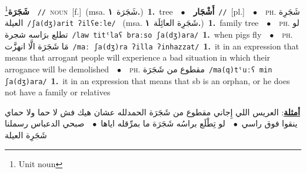 \documentclass[10pt,a4paper,twoside]{article} %
\begin{document}
\begin{multicols}{2}
{\setlength\topsep{0pt}\textbf{\foreignlanguage{arabic}{شَجَرَة}}\footnote{Unit noun}\ \ {\color{gray}\texttt{//}\color{black}}\ \textsc{noun}\ [f.]\ \color{gray}(msa. \foreignlanguage{arabic}{شَجَرَة}~\foreignlanguage{arabic}{\textbf{١.}})\color{black}\ \textbf{1.}~tree\ \ $\bullet$\ \ \setlength\topsep{0pt}\textbf{\foreignlanguage{arabic}{أَشْجَار}}\ {\color{gray}\texttt{//}\color{black}}\ [pl.]\ \ $\bullet$\ \ \textsc{ph.} \color{gray} \foreignlanguage{arabic}{شَجَرِة العيلة}\color{black}\ {\color{gray}\texttt{/{\sffamily ʃa(dʒ)arit ʔilʕeːle}/}\color{black}}\ \color{gray} (msa. \foreignlanguage{arabic}{شَجَرِة العائِلَة}~\foreignlanguage{arabic}{\textbf{١.}})\color{black}\ \textbf{1.}~family tree\ \ $\bullet$\ \ \textsc{ph.} \color{gray} \foreignlanguage{arabic}{لو تطلع برَاسه شجرة}\color{black}\ {\color{gray}\texttt{/{\sffamily law titˤlaʕ braːso ʃa(dʒ)ara}/}\color{black}}\ \textbf{1.}~when pigs fly\ \ $\bullet$\ \ \textsc{ph.} \color{gray} \foreignlanguage{arabic}{مَا شَجَرَة الَّا انهزَّت}\color{black}\ {\color{gray}\texttt{/{\sffamily maː ʃa(dʒ)ra ʔilla ʔinhazzat}/}\color{black}}\ \textbf{1.}~it in an expression that means that arrogant people will experience a bad situation in which their arrogance will be demolished\ \ $\bullet$\ \ \textsc{ph.} \color{gray} \foreignlanguage{arabic}{مقطوع من شَجَرَة}\color{black}\ {\color{gray}\texttt{/{\sffamily ma(q)tˤuːʕ min ʃa(dʒ)ara}/}\color{black}}\ \textbf{1.}~it in an expression that means that sb is an orphan, or he does not have a family or relatives\  \begin{flushright}\color{gray}\foreignlanguage{arabic}{\textbf{\underline{\foreignlanguage{arabic}{أمثلة}}}: العريس اللي إِجاني مقطوع من شَجَرَة الحمدلله عشان هيك فش لا حما ولا حماي ينقوا فوق راسي\ $\bullet$\ \  لو تِطْلَع براسُه شَجَرَة ما بمرِّقله اياها\ $\bullet$\ \  صبحي الدعباس رسملنا شَجَرِة العيلة}\end{flushright}\color{black}} \vspace{2mm}


\end{multicols}
\end{document}
